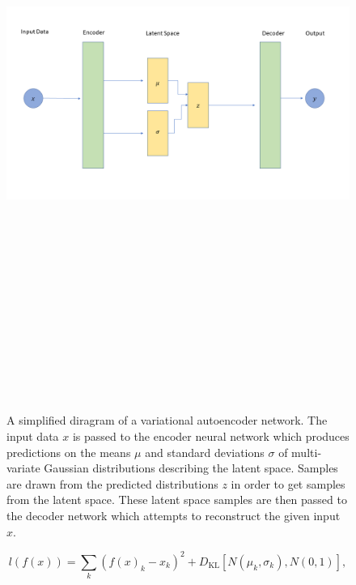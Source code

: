 \begin{figure}
    \centering
    \includegraphics[width=16cm,height=20cm,keepaspectratio]{figures/simple_vae_diagram.png}
    \caption{A simplified diragram of a variational autoencoder network. The input data $x$ is passed to the encoder neural network which produces predictions on the means $\mu$ and standard deviations $\sigma$ of multi-variate Gaussian distributions describing the latent space. Samples are drawn from the predicted distributions $z$ in order to get samples from the latent space. These latent space samples are then passed to the decoder network which attempts to reconstruct the given input $x$.}
    \label{fig:simple_vae}
\end{figure}

\begin{equation}
    l(f(x)) = \sum_k{ (f(x)_k - x_k)^2 + 
    D_{\textrm{KL}}[N(\mu_k, \sigma_k), N(0, 1)]},
\end{equation}

